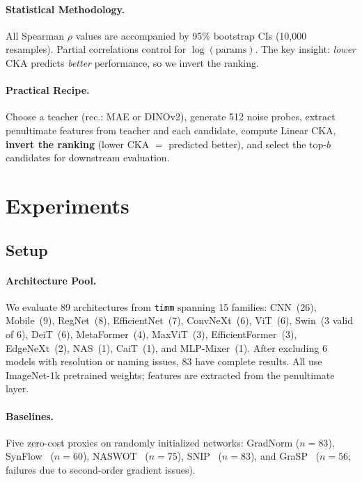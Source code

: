 \documentclass[10pt,twocolumn,letterpaper]{article}
\begin{document}
\paragraph{Statistical Methodology.}
All Spearman $\rho$ values are accompanied by 95\% bootstrap CIs (10,000 resamples).
Partial correlations control for $\log(\text{params})$.
The key insight: \emph{lower} CKA predicts \emph{better} performance, so we invert the ranking.

\paragraph{Practical Recipe.}
Choose a teacher (rec.: MAE or DINOv2), generate 512 noise probes, extract penultimate features from teacher and each candidate, compute Linear CKA, \textbf{invert the ranking} (lower CKA $=$ predicted better), and select the top-$b$ candidates for downstream evaluation.


\section{Experiments}
\label{sec:experiments}

\subsection{Setup}
\label{sec:setup}

\paragraph{Architecture Pool.}
We evaluate 89 architectures from \texttt{timm} spanning 15 families: CNN~(26), Mobile~(9), RegNet~(8), EfficientNet~(7), ConvNeXt~(6), ViT~(6), Swin~(3 valid of 6), DeiT~(6), MetaFormer~(4), MaxViT~(3), EfficientFormer~(3), EdgeNeXt~(2), NAS~(1), CaiT~(1), and MLP-Mixer~(1).
After excluding 6 models with resolution or naming issues, 83 have complete results.
All use ImageNet-1k pretrained weights; features are extracted from the penultimate layer.

\paragraph{Baselines.}
Five zero-cost proxies on randomly initialized networks: GradNorm ($n{=}83$), SynFlow~\cite{tanaka2020synflow} ($n{=}60$), NASWOT~\cite{mellor2021naswot} ($n{=}75$), SNIP~\cite{lee2019snip} ($n{=}83$), and GraSP~\cite{wang2020grasp} ($n{=}56$; failures due to second-order gradient issues).
\end{document}
